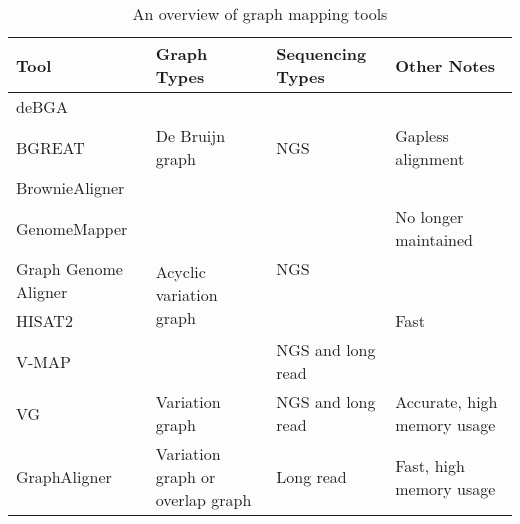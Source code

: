 \begin{table}[h!]
\centering
\caption{An overview of graph mapping tools}
\vspace{10mm}
\label{table:mappers}
\begin{tabular}{|p{2.25cm}|p{2.5cm}|p{1.75cm}|p{2.5cm}|}
 \hline
 \textbf{Tool} & \textbf{Graph Types} & \textbf{Sequencing Types} & \textbf{Other Notes} \\
 \hline
 \hline
deBGA & \multirow[c]{3}{=}{De Bruijn graph} & \multirow[c]{3}{=}{NGS} &  \\ \cline{1-1} \cline{4-4}
BGREAT &  &  & Gapless alignment  \\ \cline{1-1} \cline{4-4}
BrownieAligner &  &  &   \\ \hline
GenomeMapper & \multirow[c]{4}{=}{Acyclic variation graph} & \multirow[c]{3}{=}{NGS} & No longer maintained \\ \cline{1-1} \cline{4-4}
Graph Genome Aligner &  &  &  \\ \cline{1-1} \cline{4-4}
HISAT2 &  &  & Fast \\ \cline{1-1} \cline{3-4}
V-MAP &  & NGS and long read & \\ \hline
VG & Variation graph & NGS and long read & Accurate, high memory usage \\ \hline
GraphAligner & Variation graph or overlap graph & Long read & Fast, high memory usage \\ \hline
\end{tabular}
\end{table}
